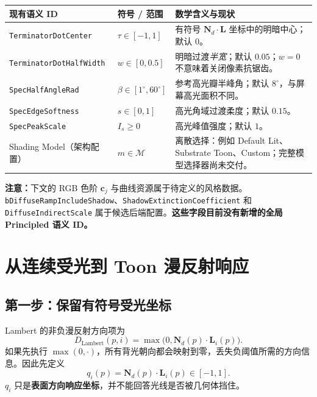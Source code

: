 \documentclass[UTF8,11pt,a4paper]{ctexart}
\numberwithin{equation}{section}
\begin{document}
\begin{center}
\small
\begin{tabularx}{\linewidth}{@{}p{46mm}p{23mm}X@{}}
\toprule
现有语义 ID & 符号 / 范围 & 数学含义与现状 \\
\midrule
\texttt{TerminatorDotCenter} & $\tau\in[-1,1]$ & 有符号 $\mathbf N_d\cdot\mathbf L$ 坐标中的明暗中心；默认 $0$。\\
\texttt{TerminatorDotHalfWidth} & $w\in[0,0.5]$ & 明暗过渡\emph{半宽}；默认 $0.05$；$w=0$ 不意味着关闭像素抗锯齿。\\
\texttt{SpecHalfAngleRad} & $\beta\in[1^\circ,60^\circ]$ & 参考高光瓣半峰角；默认 $8^\circ$，与屏幕高光面积不同。\\
\texttt{SpecEdgeSoftness} & $s\in[0,1]$ & 高光角域过渡柔度；默认 $0.15$。\\
\texttt{SpecPeakScale} & $I_s\ge 0$ & 高光峰值强度；默认 $1$。\\
Shading Model（架构配置） & $m\in\mathcal M$ & 离散选择：例如 Default Lit、Substrate Toon、Custom；完整模型选择器尚未交付。\\
\bottomrule
\end{tabularx}
\end{center}

\textbf{注意：}下文的 RGB 色阶 $\mathbf c_j$ 与曲线资源属于待定义的风格数据。\texttt{bDiffuseRampIncludeShadow}、\texttt{ShadowExtinction}\allowbreak\texttt{Coefficient} 和 \texttt{DiffuseIndirectScale} 属于候选后端配置。\textbf{这些字段目前没有新增的全局 Principled 语义 ID。}

\section{从连续受光到 Toon 漫反射响应}
\subsection{第一步：保留有符号受光坐标}
Lambert 的非负漫反射方向项为
\begin{equation}
D_{\mathrm{Lambert}}(p,i)=\max\!\bigl(0,\mathbf N_d(p)\cdot\mathbf L_i(p)\bigr).
\end{equation}
如果先执行 $\max(0,\cdot)$，所有背光朝向都会映射到零，丢失负阈值所需的方向信息。因此先定义
\begin{equation}
\boxed{q_i(p)=\mathbf N_d(p)\cdot\mathbf L_i(p)\in[-1,1].}
\label{eq:q}
\end{equation}
$q_i$ 只是\textbf{表面方向响应坐标}，并不能回答光线是否被几何体挡住。
\end{document}
